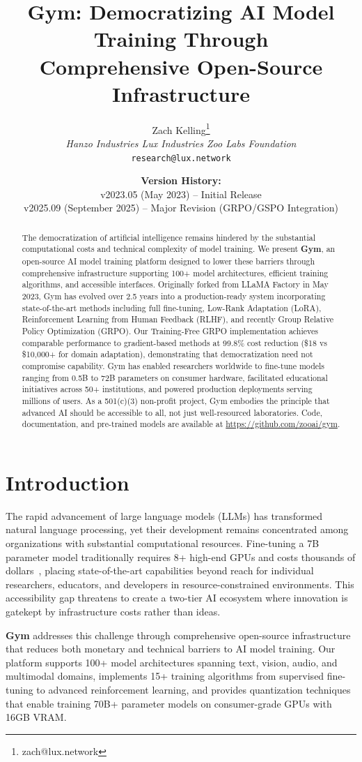 \documentclass[11pt,letterpaper]{article}
\title{Gym: Democratizing AI Model Training Through\\Comprehensive Open-Source Infrastructure}
\author{
Zach Kelling\thanks{zach@lux.network}\\
\textit{Hanzo Industries \quad Lux Industries \quad Zoo Labs Foundation}\\
\texttt{research@lux.network}
}
\date{
\textbf{Version History:}\\
v2023.05 (May 2023) -- Initial Release\\
v2025.09 (September 2025) -- Major Revision (GRPO/GSPO Integration)
}
\begin{document}
\zoocoverpage

\begin{abstract}
The democratization of artificial intelligence remains hindered by the substantial computational costs and technical complexity of model training. We present \textbf{Gym}, an open-source AI model training platform designed to lower these barriers through comprehensive infrastructure supporting 100+ model architectures, efficient training algorithms, and accessible interfaces. Originally forked from LLaMA Factory in May 2023, Gym has evolved over 2.5 years into a production-ready system incorporating state-of-the-art methods including full fine-tuning, Low-Rank Adaptation (LoRA), Reinforcement Learning from Human Feedback (RLHF), and recently Group Relative Policy Optimization (GRPO). Our Training-Free GRPO implementation achieves comparable performance to gradient-based methods at 99.8\% cost reduction (\$18 vs \$10,000+ for domain adaptation), demonstrating that democratization need not compromise capability. Gym has enabled researchers worldwide to fine-tune models ranging from 0.5B to 72B parameters on consumer hardware, facilitated educational initiatives across 50+ institutions, and powered production deployments serving millions of users. As a 501(c)(3) non-profit project, Gym embodies the principle that advanced AI should be accessible to all, not just well-resourced laboratories. Code, documentation, and pre-trained models are available at \url{https://github.com/zooai/gym}.
\end{abstract}

\section{Introduction}

The rapid advancement of large language models (LLMs) has transformed natural language processing, yet their development remains concentrated among organizations with substantial computational resources. Fine-tuning a 7B parameter model traditionally requires 8+ high-end GPUs and costs thousands of dollars~\citep{touvron2023llama}, placing state-of-the-art capabilities beyond reach for individual researchers, educators, and developers in resource-constrained environments. This accessibility gap threatens to create a two-tier AI ecosystem where innovation is gatekept by infrastructure costs rather than ideas.

\textbf{Gym} addresses this challenge through comprehensive open-source infrastructure that reduces both monetary and technical barriers to AI model training. Our platform supports 100+ model architectures spanning text, vision, audio, and multimodal domains, implements 15+ training algorithms from supervised fine-tuning to advanced reinforcement learning, and provides quantization techniques that enable training 70B+ parameter models on consumer-grade GPUs with 16GB VRAM.
\end{document}
